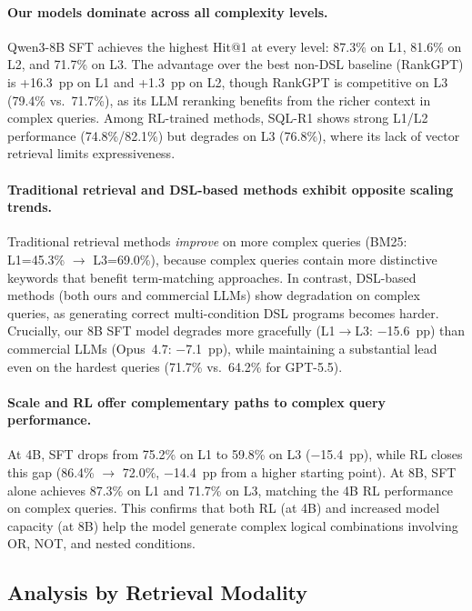 \paragraph{Our models dominate across all complexity levels.}
Qwen3-8B SFT achieves the highest Hit@1 at every level: 87.3\% on L1, 81.6\% on L2, and 71.7\% on L3. The advantage over the best non-DSL baseline (RankGPT) is +16.3~pp on L1 and +1.3~pp on L2, though RankGPT is competitive on L3 (79.4\% vs.\ 71.7\%), as its LLM reranking benefits from the richer context in complex queries. Among RL-trained methods, SQL-R1 shows strong L1/L2 performance (74.8\%/82.1\%) but degrades on L3 (76.8\%), where its lack of vector retrieval limits expressiveness.

\paragraph{Traditional retrieval and DSL-based methods exhibit opposite scaling trends.}
Traditional retrieval methods \emph{improve} on more complex queries (BM25: L1=45.3\% $\to$ L3=69.0\%), because complex queries contain more distinctive keywords that benefit term-matching approaches.
In contrast, DSL-based methods (both ours and commercial LLMs) show degradation on complex queries, as generating correct multi-condition DSL programs becomes harder.
Crucially, our 8B SFT model degrades more gracefully (L1$\to$L3: $-$15.6~pp) than commercial LLMs (Opus~4.7: $-$7.1~pp), while maintaining a substantial lead even on the hardest queries (71.7\% vs.\ 64.2\% for GPT-5.5).

\paragraph{Scale and RL offer complementary paths to complex query performance.}
At 4B, SFT drops from 75.2\% on L1 to 59.8\% on L3 ($-$15.4~pp), while RL closes this gap (86.4\% $\to$ 72.0\%, $-$14.4~pp from a higher starting point). At 8B, SFT alone achieves 87.3\% on L1 and 71.7\% on L3, matching the 4B RL performance on complex queries. This confirms that both RL (at 4B) and increased model capacity (at 8B) help the model generate complex logical combinations involving OR, NOT, and nested conditions.


\subsection{Analysis by Retrieval Modality}
\label{sec:modality}


